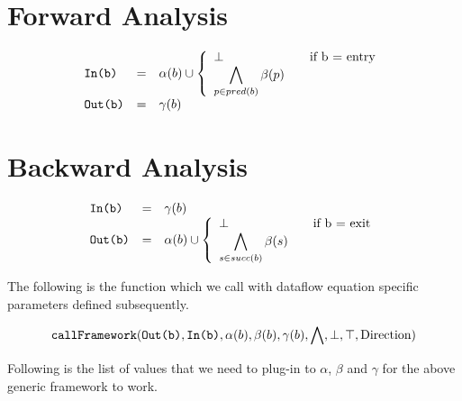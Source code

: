 \section{Forward Analysis}
\begin{equation}
\begin{array}{l c l}
\texttt{In(b)} &=& \alpha(b) \cup  \left\{
                    \begin{array}{l l}
                        \bot & \quad \text{if b = entry}\\
                        \displaystyle \bigwedge_{p \in pred(b)} \beta(p)&
                    \end{array} \right. \\
\texttt{Out(b)} &=& \gamma(b)                      
\end{array}
\end{equation}

\section{Backward Analysis}
\begin{equation}
\begin{array}{l c l}
\texttt{In(b)} &=& \gamma(b)                      \\
\texttt{Out(b)} &=& \alpha(b) \cup  \left\{
                    \begin{array}{l l}
                        \bot & \quad \text{if b = exit}\\
                        \displaystyle \bigwedge_{s \in succ(b)} \beta(s)&
                    \end{array} \right. \\
\end{array}
\end{equation}

The following is the function which we call with dataflow equation
specific parameters defined subsequently.

\begin{framed}
\[
\texttt{callFramework}(\texttt{Out(b)}, \texttt{In(b)}, \alpha(b), \beta(b),\gamma(b), \bigwedge, \bot, \top, \text{Direction})
\]
\end{framed}

Following is the list of values that we need to plug-in to $\alpha$,
          $\beta$ and $\gamma$ for the above generic framework
          to work.



